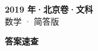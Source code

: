 \documentclass[zihao=-4, a4paper]{ctexart}
\begin{document}
\begin{center}
  {\Large\bfseries 2019 年·北京卷·文科}\\[4pt]
  {\large 数学 · 简答版}
\end{center}
\medskip
{}

\clearpage
{}
\begin{center}{\Large\bfseries 答案速查}\end{center}
\medskip

\end{document}
